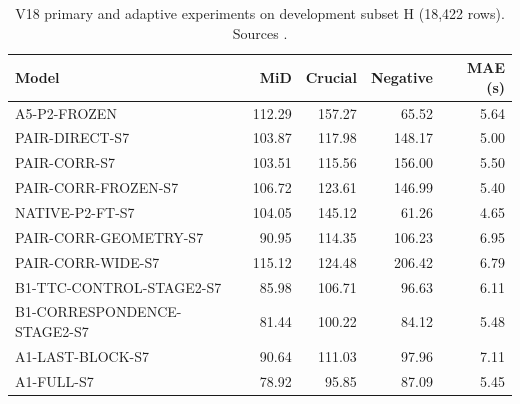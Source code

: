 \begin{table}[tbp]
\centering\small
\caption{V18 primary and adaptive experiments on development subset H (18,422 rows). Sources .}
\label{tab:late_v18}
\begin{tabular}{lrrrr}
\toprule
\textbf{Model} & \textbf{MiD} & \textbf{Crucial} & \textbf{Negative} & \textbf{MAE (s)} \\
\midrule
A5-P2-FROZEN & 112.29 & 157.27 & 65.52 & 5.64 \\
PAIR-DIRECT-S7 & 103.87 & 117.98 & 148.17 & 5.00 \\
PAIR-CORR-S7 & 103.51 & 115.56 & 156.00 & 5.50 \\
PAIR-CORR-FROZEN-S7 & 106.72 & 123.61 & 146.99 & 5.40 \\
NATIVE-P2-FT-S7 & 104.05 & 145.12 & 61.26 & 4.65 \\
PAIR-CORR-GEOMETRY-S7 & 90.95 & 114.35 & 106.23 & 6.95 \\
PAIR-CORR-WIDE-S7 & 115.12 & 124.48 & 206.42 & 6.79 \\
B1-TTC-CONTROL-STAGE2-S7 & 85.98 & 106.71 & 96.63 & 6.11 \\
B1-CORRESPONDENCE-STAGE2-S7 & 81.44 & 100.22 & 84.12 & 5.48 \\
A1-LAST-BLOCK-S7 & 90.64 & 111.03 & 97.96 & 7.11 \\
A1-FULL-S7 & 78.92 & 95.85 & 87.09 & 5.45 \\
\bottomrule
\end{tabular}
\end{table}